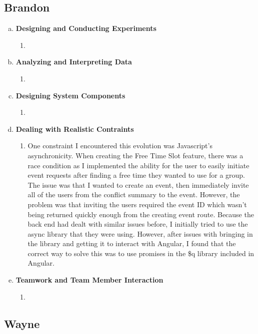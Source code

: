 \documentclass[11pt]{article}   %
\begin{document}
\subsection*{Brandon}

\begin{enumerate} [a)]
\item  {\bf Designing and Conducting Experiments}
\begin{enumerate} [$\cdot$]
\item 
\end{enumerate}
\item  {\bf Analyzing and Interpreting Data}
\begin{enumerate} [$\cdot$]
\item  
\end{enumerate}
\item {\bf Designing System Components}
\begin{enumerate} [$\cdot$]
\item 
\end{enumerate}
\item {\bf Dealing with Realistic Contraints}
\begin{enumerate} [$\cdot$]
\item One constraint I encountered this evolution was Javascript's asynchronicity. When creating the Free Time Slot feature, there was a race condition as I implemented the ability for the user to easily initiate event requests after finding a free time they wanted to use for a group. The issue was that I wanted to create an event, then immediately invite all of the users from the conflict summary to the event. However, the problem was that inviting the users required the event ID which wasn't being returned quickly enough from the creating event route. Because the back end had dealt with similar issues before, I initially tried to use the async library that they were using. However, after issues with bringing in the library and getting it to interact with Angular, I found that the correct way to solve this was to use promises in the \$q library included in Angular. 
\end{enumerate}
\item  {\bf Teamwork and Team Member Interaction}
\begin{enumerate} [$\cdot$]
\item 
\end{enumerate}
\end{enumerate}

\subsection*{Wayne}
\end{document}
